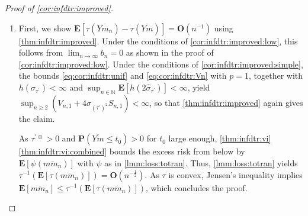 \documentclass{article}
\newcommand*{\mo}[1]{\mathbf{#1}}
\newcommand{\N}{\mathbb{N}}
\newcommand{\lab}{\left[} %
\newcommand{\rab}{\right]} %
\newcommand{\ab}[1]{\lab #1 \rab} %
\newcommand{\abOf}[1]{\!\ab{#1}} %
\newcommand{\lb}{\left(} %
\newcommand{\rb}{\right)} %
\newcommand{\br}[1]{\lb #1 \rb} %
\newcommand{\brOf}[1]{\!\br{#1}} %
\renewcommand{\Pr}{\mathbf{P}} %
\newcommand{\Prof}[1]{\Pr(#1)}
\newcommand{\E}{\mathbf{E}} %
\newcommand{\Eof}[1]{\E[#1]}
\newcommand{\EOf}[1]{\E\abOf{#1}}
\newcommand{\pr}{^\prime}
\newcommand{\ol}[2]{\overline{#1#2}}
\newcommand{\tran}{\tau}
\newcommand{\dtran}{\tau\pr}
\newcommand{\ddrtran}{\tau^{\prime\oplus}}
\begin{document}
\begin{proof}[Proof of \cref{cor:infdtr:improved}]
\begin{enumerate}[label=(\roman*)]
        Furthermore, by \eqref{eq:cor:infdtr:unif}, \eqref{eq:cor:infdtr:Vn}, and the assumptions, we have $\sup_{n\geq2}\br{V_{n,p} + 4 \sigma_{(\dtran)^{2p}} S_{n,p}} < \infty$. Thus, $\lim_{n\to\infty} b_n = 0$. Finally, \cref{thm:infdtr:vi} \ref{thm:infdtr:vi:quantile} transforms the excess risk bound of \cref{thm:infdtr:improved} to the bound on $\Eof{\ol m{m_n}^2  \ddrtran(\chi + \ol m{m_n})}$.
        \item
        First, we show $\EOf{\tran(\ol Y{m_n}) - \tran(\ol Ym)} = \mo O(n^{-1})$ using \cref{thm:infdtr:improved}.
        Under the conditions of \ref{cor:infdtr:improved:low}, this follows from $\lim_{n\to\infty}b_n = 0$ as shown in the proof of \ref{cor:infdtr:improved:low}.
        Under the conditions of \ref{cor:infdtr:improved:simple}, the bounds \eqref{eq:cor:infdtr:unif} and \eqref{eq:cor:infdtr:Vn} with $p=1$, together with $h(\sigma_{\dtran}) < \infty$ and $\sup_{n\in\N}\Eof{h(2\hat\sigma_{\dtran})} < \infty$, yield $\sup_{n\geq2}\br{V_{n,1} + 4 \sigma_{(\dtran)^{2}} S_{n,1}} < \infty$, so that \cref{thm:infdtr:improved} again gives the claim.
        
        As $\ddrtran > 0$ and $\Prof{\ol Ym \leq t_0} > 0$ for $t_0$ large enough, \cref{thm:infdtr:vi} \ref{thm:infdtr:vi:combined} bounds the excess risk from below by $\Eof{\psi(\ol m{m_n})}$ with $\psi$ as in \cref{lmm:loss:totran}. Thus, \cref{lmm:loss:totran} yields $\tran^{-1}\brOf{\Eof{\tran(\ol m{m_n})}} = \mo O(n^{-\frac12})$. As $\tran$ is convex, Jensen's inequality implies $\Eof{\ol m{m_n}} \leq \tran^{-1}\brOf{\Eof{\tran(\ol m{m_n})}}$, which concludes the proof.
    \end{enumerate}
\end{proof}
%
\end{document}
